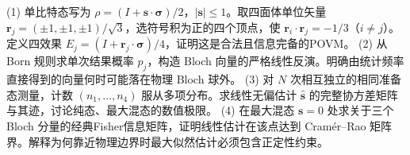 (1) 单比特态写为 \(\rho=(I+\boldsymbol s\cdot\boldsymbol\sigma)/2\)，\(|\boldsymbol s|\le1\)。取四面体单位矢量 \(\boldsymbol r_j=(\pm1,\pm1,\pm1)/\sqrt3\)，选符号积为正的四个顶点，使 \(\boldsymbol r_i\cdot\boldsymbol r_j=-1/3\)（\(i\ne j\)）。定义四效果 \(E_j=(I+\boldsymbol r_j\cdot\boldsymbol\sigma)/4\)，证明这是合法且信息完备的POVM。
(2) 从 Born 规则求单次结果概率 \(p_j\)，构造 Bloch 向量的严格线性反演。明确由统计频率直接得到的向量何时可能落在物理 Bloch 球外。
(3) 对 \(N\) 次相互独立的相同准备态测量，计数 \((n_1,\ldots,n_4)\) 服从多项分布。求线性无偏估计 \(\hat{\boldsymbol s}\) 的完整协方差矩阵与其迹，讨论纯态、最大混态的数值极限。
(4) 在最大混态 \(\boldsymbol s=0\) 处求关于三个 Bloch 分量的经典Fisher信息矩阵，证明线性估计在该点达到 Cramér–Rao 矩阵界。解释为何靠近物理边界时最大似然估计必须包含正定性约束。
